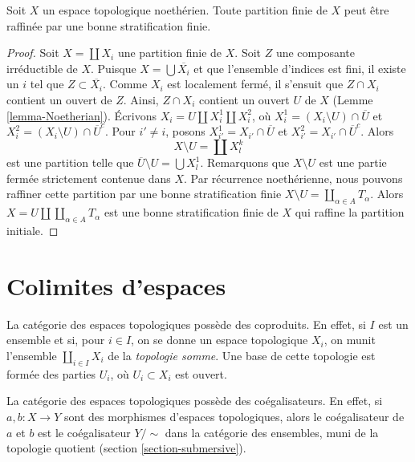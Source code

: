 \begin{lemma}
\label{lemma-noetherian-partition-refined-by-stratification}
Soit $X$ un espace topologique noethérien. Toute partition finie
de $X$ peut être raffinée par une bonne stratification finie.
\end{lemma}

\begin{proof}
Soit $X = \coprod X_i$ une partition finie de $X$.
Soit $Z$ une composante irréductible de $X$. Puisque
$X = \bigcup \overline{X_i}$ et que l'ensemble d'indices est fini, il existe
un $i$ tel que $Z \subset \overline{X_i}$. Comme $X_i$ est localement fermé,
il s'ensuit que $Z \cap X_i$ contient un ouvert de $Z$. Ainsi,
$Z \cap X_i$ contient un ouvert $U$ de $X$ (Lemme \ref{lemma-Noetherian}).
Écrivons $X_i = U \amalg X_i^1 \amalg X_i^2$, où
$X_i^1 = (X_i \setminus U) \cap \overline{U}$ et
$X_i^2 = (X_i \setminus U) \cap \overline{U}^c$.
Pour $i' \not = i$, posons
$X_{i'}^1 = X_{i'} \cap \overline{U}$ et
$X_{i'}^2 = X_{i'} \cap \overline{U}^c$.
Alors
$$
X \setminus U = \coprod X^k_l
$$
est une partition telle que $\overline{U} \setminus U = \bigcup X_l^1$.
Remarquons que $X \setminus U$ est une partie fermée strictement contenue
dans $X$.
Par récurrence noethérienne, nous pouvons raffiner cette partition
par une bonne stratification finie
$X \setminus U = \coprod_{\alpha \in A} T_\alpha$.
Alors $X = U \amalg \coprod_{\alpha \in A} T_\alpha$ est une bonne
stratification finie de $X$ qui raffine la partition initiale.
\end{proof}







\section{Colimites d'espaces}
\label{section-colimits}

\noindent
La catégorie des espaces topologiques possède des coproduits. En effet, si
$I$ est un ensemble et si, pour $i \in I$, on se donne un espace topologique
$X_i$, on munit l'ensemble $\coprod_{i \in I} X_i$ de la {\it topologie
somme}. Une base de cette topologie est formée des parties $U_i$, où
$U_i \subset X_i$ est ouvert.

\medskip\noindent
La catégorie des espaces topologiques possède des coégalisateurs. En effet,
si $a, b : X \to Y$ sont des morphismes d'espaces topologiques, alors le
coégalisateur de $a$ et $b$ est le coégalisateur $Y/\sim$ dans la catégorie
des ensembles, muni de la topologie quotient (section \ref{section-submersive}).

